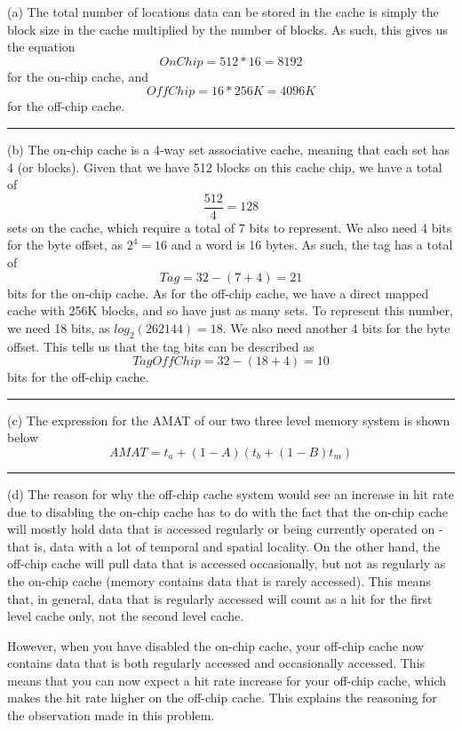 \documentclass[12pt, letter]{article}
\begin{document}
	(a) The total number of locations data can be stored in the cache is simply the block size in the cache multiplied by the number of blocks. As such, this gives us the equation
	\begin{equation}
		OnChip = 512 * 16 = 8192
	\end{equation}
	for the on-chip cache, and 
	\begin{equation}
		OffChip = 16 * 256K = 4096K 
	\end{equation}
	 for the off-chip cache.
	 \bigskip
	 \hrule
	 
	 (b) The on-chip cache is a 4-way set associative cache, meaning that each set has 4 (or blocks). Given that we have 512 blocks on this cache chip, we have a total of
	 \begin{equation}
	 	\frac{512}{4} = 128
	 \end{equation}
 	 sets on the cache, which require a total of 7 bits to represent. We also need 4 bits for the byte offset, as $2^4 = 16$ and a word is 16 bytes. As such, the tag has a total of 
 	 \begin{equation}
 	 	Tag = 32 - (7+4) = 21
 	 \end{equation} 
  	bits for the on-chip cache. As for the off-chip cache, we have a direct mapped cache with 256K blocks, and so have just as many sets. To represent this number, we need 18 bits, as $log_2(262144) = 18$. We also need another 4 bits for the byte offset. This tells us that the tag bits can be described as
  	\begin{equation}
  		TagOffChip = 32-(18+4) = 10
  	\end{equation}
  	bits for the off-chip cache.
  	\hrule
  	
  	(c) The expression for the AMAT of our two three level memory system is shown below
  	\begin{equation}
  		AMAT = t_a + (1-A)(t_b + (1-B)t_m)
  	\end{equation}
  	\hrule
  	
  	(d) The reason for why the off-chip cache system would see an increase in hit rate due to disabling the on-chip cache has to do with the fact that the on-chip cache will mostly hold data that is accessed regularly or being currently operated on - that is, data with a lot of temporal and spatial locality. On the other hand, the off-chip cache will pull data that is accessed occasionally, but not as regularly as the on-chip cache (memory contains data that is rarely accessed). This means that, in general, data that is regularly accessed will count as a hit for the first level cache only, not the second level cache. 
  	
  	However, when you have disabled the on-chip cache, your off-chip cache now contains data that is both regularly accessed and occasionally accessed. This means that you can now expect a hit rate increase for your off-chip cache, which makes the hit rate higher on the off-chip cache. This explains the reasoning for the observation made in this problem.
\end{document}

